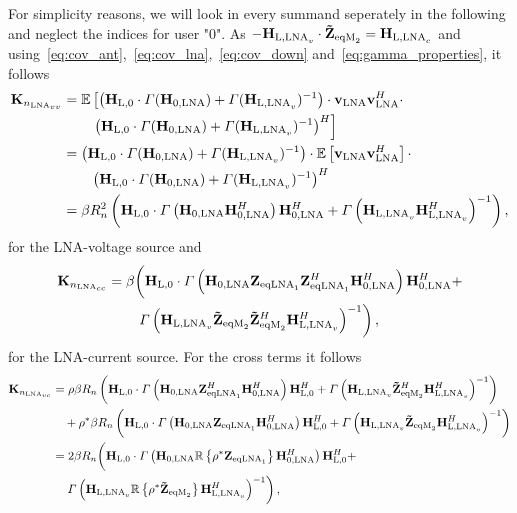 For simplicity reasons, we will look in every summand seperately in the following and neglect the indices for user "0".
As $-\mathbf{H}_{\text{L,LNA}_v}\cdot\mathbf{\tilde{Z}}_{\text{eqM}_2} = \mathbf{H}_{\text{L,LNA}_c}$ and using~\eqref{eq:cov_ant},~\eqref{eq:cov_lna},~\eqref{eq:cov_down} and~\eqref{eq:gamma_properties}, it follows
\begin{align}
\nonumber
\mathbf{K}_{n_{\text{LNA}_{vv}}} &= \mathbb{E}\left[\left(\mathbf{H}_\text{L,0}\cdot\Gamma(\mathbf{H}_\text{0,LNA})+\Gamma(\mathbf{H}_{\text{L,LNA}_v})^{-1}\right)\cdot\mathbf{v}_\text{LNA}\mathbf{v}_\text{LNA}^H\cdot\right.\\\nonumber
&\qquad\left.\left(\mathbf{H}_\text{L,0}\cdot\Gamma(\mathbf{H}_\text{0,LNA})+\Gamma(\mathbf{H}_{\text{L,LNA}_v})^{-1}\right)^H\right]\\\nonumber
&=\left(\mathbf{H}_\text{L,0}\cdot\Gamma(\mathbf{H}_\text{0,LNA})+\Gamma(\mathbf{H}_{\text{L,LNA}_v})^{-1}\right)\cdot\mathbb{E}\left[\mathbf{v}_\text{LNA}\mathbf{v}_\text{LNA}^H\right]\cdot\\\nonumber
&\qquad\left(\mathbf{H}_\text{L,0}\cdot\Gamma(\mathbf{H}_\text{0,LNA})+\Gamma(\mathbf{H}_{\text{L,LNA}_v})^{-1}\right)^H\\
&=\beta R_n^2\left(\mathbf{H}_\text{L,0}\cdot\Gamma\left(\mathbf{H}_\text{0,LNA}\mathbf{H}_\text{0,LNA}^H\right)\mathbf{H}_\text{0,LNA}^H+\Gamma\left(\mathbf{H}_{\text{L,LNA}_v}\mathbf{H}_{\text{L,LNA}_v}^H\right)^{-1}\right),
\end{align}
for the LNA-voltage source and
\begin{align}
\nonumber
\mathbf{K}_{n_{\text{LNA}_{cc}}} &= 
\beta \biggl(\mathbf{H}_\text{L,0}\cdot\Gamma\left(\mathbf{H}_\text{0,LNA}\mathbf{Z}_{\text{eqLNA}_1}\mathbf{Z}_{\text{eqLNA}_1}^H\mathbf{H}_\text{0,LNA}^H\right)\mathbf{H}_\text{0,LNA}^H+\\
&\qquad\left.\Gamma\left(\mathbf{H}_{\text{L,LNA}_v}\mathbf{\tilde{Z}}_{\text{eqM}_2}\mathbf{\tilde{Z}}_{\text{eqM}_2}^H\mathbf{H}_{\text{L,LNA}_v}^H\right)^{-1}\right),
\end{align}
for the LNA-current source.
For the cross terms it follows
\begin{align}
\nonumber
\mathbf{K}_{n_{\text{LNA}_{vc}}} &= \rho\beta R_n
\left(\mathbf{H}_\text{L,0}\cdot\Gamma\left(\mathbf{H}_\text{0,LNA}\mathbf{Z}_{\text{eqLNA}_1}^H\mathbf{H}_\text{0,LNA}^H\right)\mathbf{H}_\text{L,0}^H + 
\Gamma\left(\mathbf{H}_{\text{L,LNA}_v}\mathbf{\tilde{Z}}_{\text{eqM}_2}^H\mathbf{H}_{\text{L,LNA}_v}^H\right)^{-1}\right)\\\nonumber
&\quad+
\rho^*\beta R_n
\left(\mathbf{H}_\text{L,0}\cdot\Gamma\left(\mathbf{H}_\text{0,LNA}\mathbf{Z}_{\text{eqLNA}_1}\mathbf{H}_\text{0,LNA}^H\right)\mathbf{H}_\text{L,0}^H + 
\Gamma\left(\mathbf{H}_{\text{L,LNA}_v}\mathbf{\tilde{Z}}_{\text{eqM}_2}\mathbf{H}_{\text{L,LNA}_v}^H\right)^{-1}\right)\\\nonumber
&= 2 \beta R_n\biggl(
\mathbf{H}_\text{L,0}\cdot\Gamma\left(\mathbf{H}_\text{0,LNA}\mathbb{R}\left\{\rho^*\mathbf{Z}_{\text{eqLNA}_1}\right\}\mathbf{H}_\text{0,LNA}^H\right)\mathbf{H}_\text{L,0}^H + \\
&\quad\left.\Gamma\left(\mathbf{H}_{\text{L,LNA}_v}\mathbb{R}\left\{\rho^*\mathbf{\tilde{Z}}_{\text{eqM}_2}\right\}\mathbf{H}_{\text{L,LNA}_v}^H\right)^{-1}\right),
\end{align}
